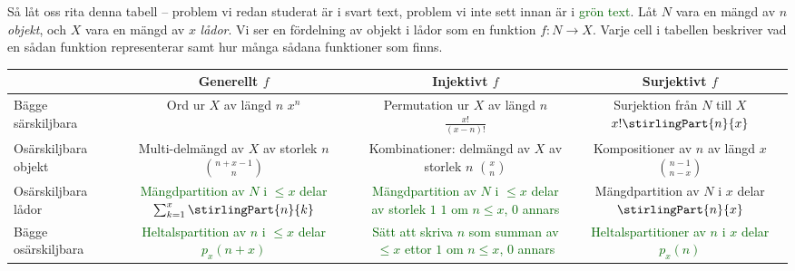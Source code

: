 \documentclass[nobib]{tufte-handout}
\begin{document}
Så låt oss rita denna tabell -- problem vi redan studerat är i svart text, problem vi inte sett innan är i \textcolor{darkgreen}{grön text}. Låt $N$ vara en mängd av $n$ \emph{objekt}, och $X$ vara en mängd av $x$ \emph{lådor}. Vi ser en fördelning av objekt i lådor som en funktion $f: N \to X$. Varje cell i tabellen beskriver vad en sådan funktion representerar samt hur många sådana funktioner som finns.

\begin{fullwidth}
  \begin{tabularx}{\linewidth}{l|ccc}
      & Generellt $f$ & Injektivt $f$ & Surjektivt $f$\\
      \midrule
    Bägge särskiljbara & \specialcell{Ord ur $X$ av längd $n$\\ $x^n$} & \specialcell{Permutation ur $X$ av längd $n$\\ $\frac{x!}{(x-n)!}$} & \specialcell{Surjektion från $N$ till $X$\\$x!\stirlingPart{n}{x}$} \\
    Osärskiljbara objekt & \specialcell{Multi-delmängd av $X$\\ av storlek $n$\\$\binom{n + x - 1}{n}$} & \specialcell{Kombinationer:\\delmängd av $X$ av storlek $n$\\$\binom{x}{n}$} & \specialcell{Kompositioner av $n$\\av längd $x$\\$\binom{n - 1}{n - x}$} \\
    Osärskiljbara lådor & \specialcell{\textcolor{darkgreen}{Mängdpartition av $N$}\\ \textcolor{darkgreen}{ i $\leq x$ delar} \\\textcolor{darkgreen}{$\sum_{k=1}^{x} \stirlingPart{n}{k}$}} & \specialcell{\textcolor{darkgreen}{Mängdpartition av $N$}\\ \textcolor{darkgreen}{i $\leq x$ delar av storlek $1$}\\\textcolor{darkgreen}{$1$ om $n \leq x$, $0$ annars}} & \specialcell{Mängdpartition av $N$\\i $x$ delar\\$\stirlingPart{n}{x}$} \\
    Bägge osärskiljbara & \specialcell{\textcolor{darkgreen}{Heltalspartition av $n$ i $\leq x$ delar}\\\textcolor{darkgreen}{$p_x(n + x)$}} & \specialcell{\textcolor{darkgreen}{Sätt att skriva $n$ som}\\\textcolor{darkgreen}{summan av $\leq x$ ettor}\\\textcolor{darkgreen}{$1$ om $n \leq x$, $0$ annars}} & \specialcell{\textcolor{darkgreen}{Heltalspartitioner av $n$}\\ \textcolor{darkgreen}{i $x$ delar} \\\textcolor{darkgreen}{$p_x(n)$}} 
  \end{tabularx}
\end{fullwidth}
\end{document}
